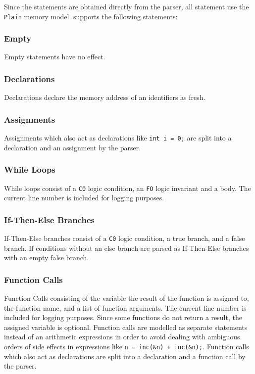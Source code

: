 \documentclass[12pt]{article}
\begin{document}
Since the statements are obtained directly from the parser, all statement use the \texttt{Plain} memory model. 
\verifyc supports the following statements:

\subsubsection*{Empty}
Empty statements have no effect.

\subsubsection*{Declarations}
Declarations declare the memory address of an identifiers as fresh.

\subsubsection*{Assignments}
Assignments which also act as declarations like \texttt{int i = 0;} are split into a declaration and an assignment by the parser.

\subsubsection*{While Loops}
While loops consist of a \texttt{C0} logic condition, an \texttt{FO} logic invariant and a body.
The current line number is included for logging purposes.

\subsubsection*{If-Then-Else Branches}
If-Then-Else branches consist of a \texttt{C0} logic condition, a true branch, and a false branch.
If conditions without an else branch are parsed as If-Then-Else branches with an empty false branch.

\subsubsection*{Function Calls}
Function Calls consisting of the variable the result of the function is assigned to, the function name, and a list of function arguments. The current line number is included for logging purposes. Since some functions do not return a result, the assigned variable is optional.
Function calls are modelled as separate statements instead of an arithmetic expressions in order to avoid dealing with ambiguous orders of side effects in expressions like \texttt{n = inc(\&n) + inc(\&n);}.
Function calls which also act as declarations are split into a declaration and a function call by the parser.
\end{document}
